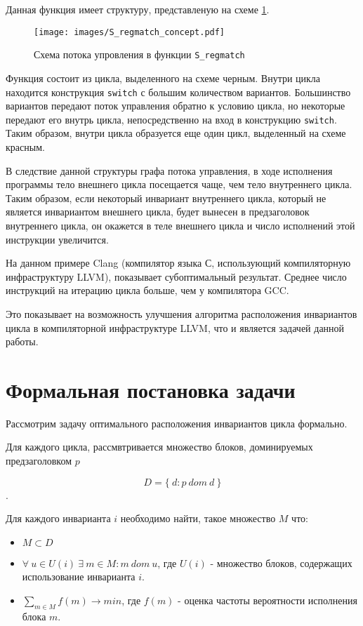 Данная функция имеет структуру, представленую на схеме \ref{fig:S_regmatch_concept}.
\begin{figure}
    \centering
    \texttt{[image: images/S\_regmatch\_concept.pdf]}
    \caption{Схема потока упровления в функции \texttt{S\_regmatch}}
    \label{fig:S_regmatch_concept}
\end{figure}

Функция состоит из цикла, выделенного на схеме черным.
Внутри цикла находится конструкция \texttt{switch} с большим количеством вариантов.
Большинство вариантов передают поток управления обратно к условию цикла, но некоторые передают его внутрь цикла, непосредственно на вход в конструкцию \texttt{switch}.
Таким образом, внутри цикла образуется еще один цикл, выделенный на схеме красным.

В следствие данной структуры графа потока управления, в ходе исполнения программы тело внешнего цикла посещается чаще, чем тело внутреннего цикла.
Таким образом, если некоторый инвариант внутреннего цикла, который не является инвариантом внешнего цикла, будет вынесен в предзаголовок внутреннего цикла, он окажется в теле внешнего цикла и число исполнений этой инструкции увеличится.

На данном примере Clang (компилятор языка С, использующий компиляторную инфраструктуру LLVM), показывает субоптимальный результат.
Среднее число инструкций на итерацию цикла больше, чем у компилятора GCC.

Это показывает на возможность улучшения алгоритма расположения инвариантов цикла в компиляторной инфраструктуре LLVM, что и является задачей данной работы.

\section{Формальная постановка задачи}

Рассмотрим задачу оптимального расположения инвариантов цикла формально.

Для каждого цикла, рассмвтривается множество блоков, доминируемых предзаголовком $p$

$$D = \{ \: d : p \: dom \: d \: \}$$.

Для каждого инварианта $i$ необходимо найти, такое множество $M$ что:
\begin{itemize}
    \item $M \subset D$
    \item $\forall \: u \in U(i) \: \exists \: m \in M : m \: dom \: u $, где $U(i)$ - множество блоков, содержащих использование инварианта $i$.
    \item $\sum_{m \in M}{f(m)} \to min $, где $f(m)$ - оценка частоты вероятности исполнения блока $m$.
\end{itemize}
\newpage
